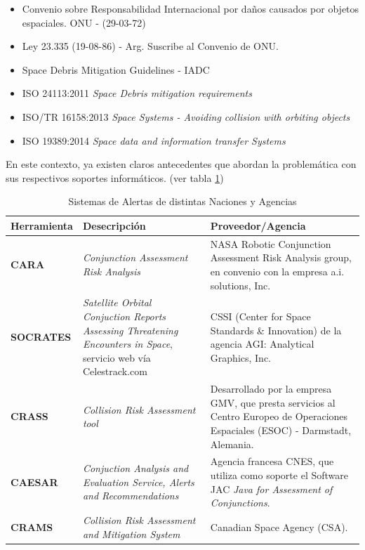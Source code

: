 \begin{itemize}
\item {\small{Convenio sobre Responsabilidad Internacional por da\~nos causados por objetos espaciales. ONU - (29-03-72)}}
\item {\small{Ley 23.335 (19-08-86) - Arg. Suscribe al Convenio de ONU.}}
\item {\small{Space Debris Mitigation Guidelines - IADC}}
\item {\small{ISO 24113:2011 {\it{Space Debris mitigation requirements}}}}
\item {\small{ISO/TR 16158:2013 {\it{Space Systems - Avoiding collision with orbiting objects}}}}
\item {\small{ISO 19389:2014 {\it{Space data and information transfer Systems}}}}

\end{itemize}


En este contexto, ya existen claros antecedentes que abordan la problem\'atica con sus respectivos soportes inform\'aticos. (ver tabla \ref{tab:sisal})
\begin{table}[!h]
\centering
\begin{tabular}{|l|p{5cm}|p{6cm}|}
\hline
Herramienta & Desecripci\'on & Proveedor/Agencia\\
\hline
{\bf{CARA}} & {\it{Conjunction Assessment Risk Analysis}} & NASA Robotic Conjunction Assessment Risk Analysis group, en convenio con la empresa a.i. solutions, Inc.\\
\hline
{\bf{SOCRATES}} & {\it{Satellite Orbital Conjuction Reports Assessing Threatening Encounters in Space}}, servicio web v\'ia Celestrack.com & CSSI (Center for Space Standards \& Innovation) de la agencia AGI: Analytical Graphics, Inc.\\
\hline
{\bf{CRASS}} & {\it{Collision Risk Assessment tool}} & Desarrollado por la
empresa GMV, que presta servicios al Centro Europeo de Operaciones
Espaciales (ESOC) - Darmstadt, Alemania. \cite{alarconRodriguez}\\
\hline
{\bf{CAESAR}} & {\it{Conjuction Analysis and Evaluation Service, Alerts and Recommendations}} & Agencia francesa CNES, que utiliza como soporte el Software JAC {\it{Java for Assessment of Conjunctions}}.\cite{laporte}\\
\hline
{\bf{CRAMS}} & {\it{Collision Risk Assessment and Mitigation System}} & Canadian Space Agency (CSA). \cite{babiker}\\
\hline
\end{tabular}
\caption[Sistemas de Alerta]{Sistemas de Alertas de distintas Naciones y Agencias}
\label{tab:sisal}
\end{table}


